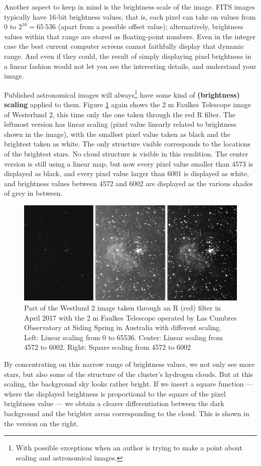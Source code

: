 \documentclass[twocolumn,apj]{openjournal}
\begin{document}
Another aspect to keep in mind is the brightness scale of the image. FITS images typically have 16-bit brightness values, that is, each pixel can take on values from 0 to $2^{16} = 65~536$ (apart from a possible offset value); alternatively, brightness values within that range are stored as floating-point numbers. Even in the integer case the best current computer screens cannot faithfully display that dynamic range. And even if they could, the result of simply displaying pixel brightness in a linear fashion would not let you see the interesting details, and understand your image. 

Published astronomical images will always\footnote{With possible exceptions when an author is trying to make a point about scaling and astronomical images.} have some kind of {\bf (brightness) scaling} applied to them. Figure \ref{ContrastComparison} again shows the 2 m Faulkes Telescope image of Westerlund 2, this time only the one taken through the red R filter. The leftmost version has linear scaling (pixel value linearly related to brightness shown in the image), with the smallest pixel value taken as black and the brightest taken as white. The only structure visible corresponds to the locations of the brightest stars. No cloud structure is visible in this rendition. The center version is still using a linear map, but now every pixel value smaller than 4573 is displayed as black, and every pixel value larger than 6001 is displayed as white, and brightness values between 4572 and 6002 are displayed as the various shades of grey in between.
\begin{figure}[htbp]
\begin{center}
\includegraphics[width=\linewidth]{comparison-scale-bw.jpg}
\caption{Part of the Westlund 2 image taken through an R (red) filter in April 2017 with the 2 m Faulkes Telescope operated by Las Cumbres Observatory at Siding Spring in Australia with different scaling. Left: Linear scaling from 0 to 65536. Center: Linear scaling from 4572 to 6002. Right: Square scaling from 4572 to 6002}
\label{ContrastComparison}
\end{center}
\end{figure}
By concentrating on this narrow range of brightness values, we not only see more stars, but also some of the structure of the cluster's hydrogen clouds. But at this scaling, the background sky looks rather bright. If we insert a square function --- where the displayed brightness is proportional to the square of the pixel brightness value --- we obtain a clearer differentiation between the dark background and the brighter areas corresponding to the cloud. This is shown in the version on the right.
\end{document}
